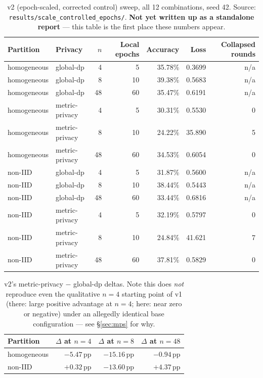 \documentclass[11pt]{article}
\newcommand{\code}[1]{\texttt{#1}}
\newcommand{\pp}{\,\text{pp}}
\begin{document}
\begin{table}[h]
\centering
\small
\begin{tabular}{llrrrrr}
\toprule
Partition & Privacy & $n$ & Local epochs & Accuracy & Loss & Collapsed rounds \\
\midrule
homogeneous & global-dp        & 4  & 5  & 35.78\% & 0.3699 & n/a \\
homogeneous & global-dp        & 8  & 10 & 39.38\% & 0.5683 & n/a \\
homogeneous & global-dp        & 48 & 60 & 35.47\% & 0.6191 & n/a \\
homogeneous & metric-privacy   & 4  & 5  & 30.31\% & 0.5530 & 0 \\
homogeneous & metric-privacy   & 8  & 10 & 24.22\% & 35.890 & 5 \\
homogeneous & metric-privacy   & 48 & 60 & 34.53\% & 0.6054 & 0 \\
non-IID     & global-dp        & 4  & 5  & 31.87\% & 0.5600 & n/a \\
non-IID     & global-dp        & 8  & 10 & 38.44\% & 0.5443 & n/a \\
non-IID     & global-dp        & 48 & 60 & 33.44\% & 0.6816 & n/a \\
non-IID     & metric-privacy   & 4  & 5  & 32.19\% & 0.5797 & 0 \\
non-IID     & metric-privacy   & 8  & 10 & 24.84\% & 41.621 & 7 \\
non-IID     & metric-privacy   & 48 & 60 & 37.81\% & 0.5829 & 0 \\
\bottomrule
\end{tabular}
\caption{v2 (epoch-scaled, corrected control) sweep, all 12 combinations, seed 42. Source:
\code{results/scale\_controlled\_epochs/}. \textbf{Not yet written up as a standalone report} ---
this table is the first place these numbers appear.}
\label{tab:v2}
\end{table}

\begin{table}[h]
\centering
\small
\begin{tabular}{lrrr}
\toprule
Partition & $\Delta$ at $n{=}4$ & $\Delta$ at $n{=}8$ & $\Delta$ at $n{=}48$ \\
\midrule
homogeneous & $-5.47\pp$ & $-15.16\pp$ & $-0.94\pp$ \\
non-IID     & $+0.32\pp$ & $-13.60\pp$ & $+4.37\pp$ \\
\bottomrule
\end{tabular}
\caption{v2's metric-privacy $-$ global-dp deltas. Note this does \emph{not} reproduce even the
qualitative $n{=}4$ starting point of v1 (there: large positive advantage at $n{=}4$; here: near
zero or negative) under an allegedly identical base configuration --- see \S\ref{sec:mps} for why.}
\label{tab:v2-delta}
\end{table}
\end{document}

